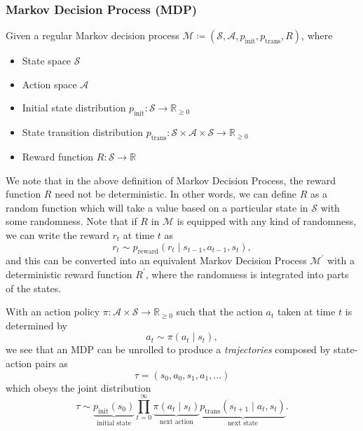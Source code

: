 \documentclass{article}
\begin{document}
\subsubsection{Markov Decision Process (MDP)}
Given a regular Markov decision process \(\mathcal{M} \coloneqq (\mathcal{S}, \mathcal{A}, p_{\mathrm{init}}, p_{\mathrm{trans}}, R)\), where
\begin{itemize}
	\item State space \(\mathcal{S}\)
	\item Action space \(\mathcal{A}\)
	\item Initial state distribution \(p_{\mathrm{init}}\colon \mathcal{S} \to \mathbb{R}_{\geq 0}\)
	\item State transition distribution \(p_{\mathrm{trans}}\colon \mathcal{S}\times \mathcal{A}\times \mathcal{S} \to \mathbb{R}_{\geq 0}\)
	\item Reward function \(R\colon \mathcal{S} \to \mathbb{R}\)
\end{itemize}

We note that in the above definition of Markov Decision Process, the reward function \(R\) need not be deterministic. In other words, we can define \(R\) as a random function
which will take a value based on a particular state in \(\mathcal{S}\) with some randomness. Note that if \(R\) in \(\mathcal{M}\) is equipped with any kind of randomness, we can
write the reward \(r_t\) at time \(t\) as
\[
	r_t\sim p_{\mathrm{reward}}(r_t\mid s_{t-1}, a_{t-1}, s_t),
\]
and this can be converted into an equivalent Markov Decision Process \(\mathcal{M}^\prime\) with a deterministic reward function \(R^\prime\), where the randomness is integrated
into parts of the states.

With an action policy \(\pi \colon \mathcal{A}\times \mathcal{S}\to \mathbb{R}_{\geq 0}\) such that the action \(a_t\) taken at time \(t\) is determined by
\[
	a_t\sim \pi(a_t\mid s_t),
\]
we see that an MDP can be unrolled to produce a \emph{trajectories} composed by state-action pairs as
\[
	\tau = (s_0, a_0, s_1, a_1, \ldots)
\]
which obeys the joint distribution
\[
	\tau \sim \underbrace{p_{\mathrm{init}}(s_0)}_{\text{initial state}}\prod_{t = 0}^{\infty} \underbrace{\pi(a_t\mid s_t)}_{\text{next action}}\underbrace{p_{\mathrm{trans}}(s_{t+1}\mid a_t, s_t)}_{\text{next state}}.
\]
\end{document}
